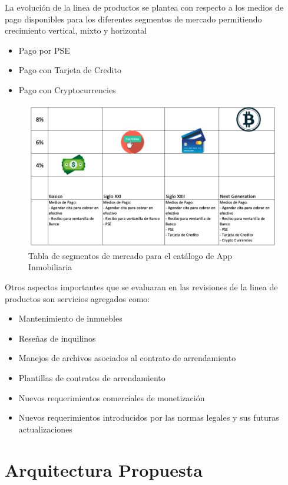 \documentclass[letterpaper]{article}
\begin{document}
La evolución de la linea de productos se plantea con respecto a los medios de pago disponibles para los diferentes segmentos de mercado permitiendo crecimiento vertical,  mixto y horizontal
\begin{itemize}
    \item Pago por PSE
    \item Pago con Tarjeta de Credito
    \item Pago con Cryptocurrencies
\end{itemize}

\begin{figure}[ht]
    \centering
    \includegraphics[scale=.5]{images/Evolucion LP.png}
    \caption{ Tabla de segmentos de mercado para el catálogo de App Inmobiliaria}
    \label{LPE}
\end{figure}
\FloatBarrier

Otros aspectos importantes que se evaluaran en las revisiones de la linea de productos son servicios agregados como:

\begin{itemize}
    \item Mantenimiento de inmuebles
    \item Reseñas de inquilinos
    \item Manejos de archivos asociados al contrato de arrendamiento
    \item Plantillas de contratos de arrendamiento
    \item Nuevos requerimientos comerciales de monetización
    \item Nuevos requerimientos introducidos por las normas legales y sus futuras actualizaciones 
\end{itemize}

\newpage

\section{\textbf{Arquitectura Propuesta}}
\end{document}
